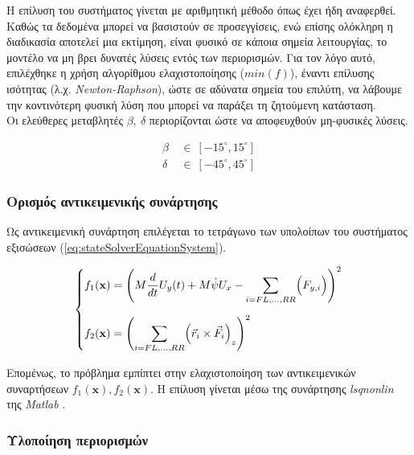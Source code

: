 Η επίλυση του συστήματος γίνεται με αριθμητική μέθοδο όπως έχει ήδη αναφερθεί. Καθώς τα δεδομένα μπορεί να βασιστούν σε προσεγγίσεις, ενώ επίσης ολόκληρη η διαδικασία αποτελεί μια εκτίμηση, είναι φυσικό σε κάποια σημεία λειτουργίας, το μοντέλο να μη βρει δυνατές λύσεις εντός των περιορισμών. Για τον λόγο αυτό, επιλέχθηκε η χρήση αλγορίθμου ελαχιστοποίησης ($min(f)$), έναντι επίλυσης ισότητας (λ.χ. \textit{Newton-Raphson}), ώστε σε αδύνατα σημεία του επιλύτη, να λάβουμε την κοντινότερη φυσική λύση που μπορεί να παράξει τη ζητούμενη κατάσταση.\\[10pt]

\noindent
Οι ελεύθερες μεταβλητές $\beta,\ \delta$ περιορίζονται ώστε να αποφευχθούν μη-φυσικές λύσεις.

\begin{equation*}
    \begin{aligned}
        \beta\ &\in\ [-15^\circ,15^\circ]\\
        \delta\ &\in\ [-45^\circ,45^\circ]       
    \end{aligned}
\end{equation*}

\subsubsection{Ορισμός αντικειμενικής συνάρτησης}

Ως αντικειμενική συνάρτηση επιλέγεται το τετράγωνο των υπολοίπων του συστήματος εξισώσεων (\ref{eq:stateSolverEquationSystem}).

\begin{equation}
    \left\{
    \begin{aligned}
        f_1(\mathbf{x}) &= \Biggl(M\dfrac{d}{dt}U_y(t) + M\dot{\psi}U_x - \sum_{i=FL,\dots,RR}\Bigl(F_{y,i}\Bigr)\Biggr)^2 \\[5pt]
        f_2(\mathbf{x}) &= \Biggl(\sum_{i=FL,\dots,RR} \Bigl(\vec{r}_i\times\vec{F}_i\Bigr)_z \Biggr)^2
    \end{aligned}
    \right.
    \label{eq:stateSolverResiduals}
\end{equation}

Επομένως, το πρόβλημα εμπίπτει στην ελαχιστοποίηση των αντικειμενικών συναρτήσεων $f_1(\mathbf{x}),f_2(\mathbf{x})$. Η επίλυση γίνεται μέσω της συνάρτησης \textit{lsqnonlin} της \textit{Matlab} \cite{mathworks_lsqnonlin}.

\subsubsection{Υλοποίηση περιορισμών}

